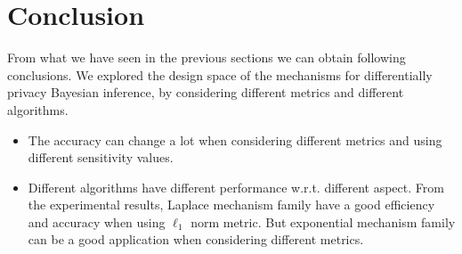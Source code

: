 \documentclass{article}
\begin{document}
\section{Conclusion}
From what we have seen in the previous sections we can obtain following conclusions. We explored the design space of the mechanisms for differentially privacy Bayesian inference, by considering different metrics and different algorithms.
\begin{itemize}
  \item The accuracy can change a lot when considering different metrics and using different sensitivity values.
  \item Different algorithms have different performance w.r.t. different aspect. From the experimental results, Laplace mechanism family have a good efficiency and accuracy when using $\ell_1$ norm metric. But exponential mechanism family can be a good application when considering different metrics.
\end{itemize}





\end{document}
